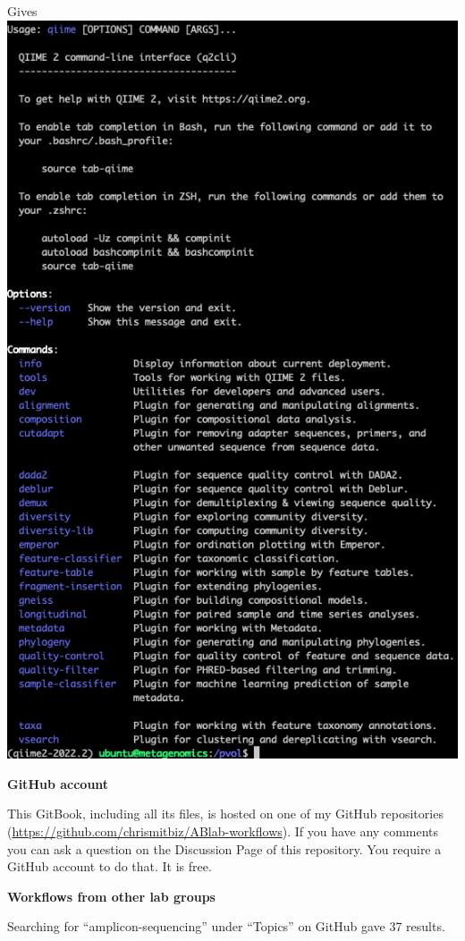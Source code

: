 \documentclass[
]{book}
\begin{document}
Gives\\
\includegraphics{./img/qiimehelp.png}

\textbf{GitHub account}

This GitBook, including all its files, is hosted on one of my GitHub repositories (\url{https://github.com/chrismitbiz/ABlab-workflows}). If you have any comments you can ask a question on the Discussion Page of this repository. You require a GitHub account to do that. It is free.

\textbf{Workflows from other lab groups}

Searching for ``amplicon-sequencing'' under ``Topics'' on GitHub gave 37 results.
\end{document}
